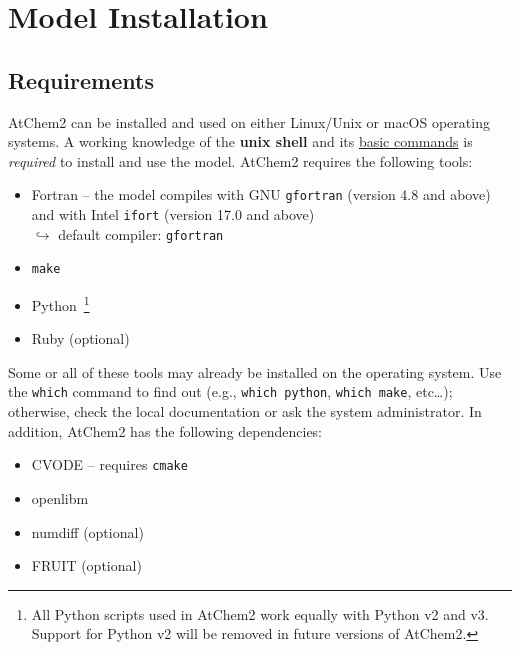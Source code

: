%
%
%
%

\chapter{Model Installation} \label{ch:installation}

\section{Requirements} \label{sec:requirements}

AtChem2 can be installed and used on either Linux/Unix or macOS
operating systems. A working knowledge of the \textbf{unix shell} and
its \href{https://swcarpentry.github.io/shell-novice/}{basic commands}
is \emph{required} to install and use the model. AtChem2 requires the
following tools:

\begin{itemize}
\item Fortran -- the model compiles with GNU \texttt{gfortran}
  (version 4.8 and above) and with Intel \texttt{ifort} (version 17.0 and above)\\
  $\hookrightarrow$ default compiler: \texttt{gfortran}
\item \texttt{make}
\item Python~\footnote{All Python scripts used in AtChem2 work equally
  with Python v2 and v3. Support for Python v2 will be removed in
  future versions of AtChem2.}
\item Ruby (optional)
\end{itemize}

Some or all of these tools may already be installed on the operating
system. Use the \texttt{which} command to find out (e.g.,
\verb|which python|, \verb|which make|, etc\ldots); otherwise, check
the local documentation or ask the system administrator. In addition,
AtChem2 has the following dependencies:

\begin{itemize}
\item CVODE -- requires \texttt{cmake}
\item openlibm
\item numdiff (optional)
\item FRUIT (optional)
\end{itemize}

